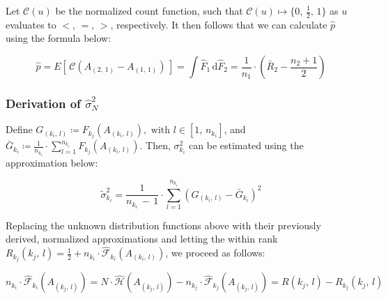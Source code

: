 \documentclass[pdflatex,sn-mathphys-num]{sn-jnl}
\theoremstyle{thmstyleone}
\theoremstyle{thmstyletwo}
\theoremstyle{thmstylethree}
\begin{document}
            \par Let $\mathcal{C}(u)$ be the normalized count function, such that $\mathcal{C}(u) \mapsto \lbrace 0, \, \frac{1}{2}, \, 1\rbrace$ as $u$ evaluates to $<, \, =, \, >$, respectively. It then follows that we can calculate $\hat{p}$ using the formula below:
    
                \vspace{10pt}
    
                \begin{equation}
                    \hat{p} = E[ \, \mathcal{C}(A_{(2, \, 1)} - A_{(1, \, 1)}) \, ] = \int \hat{F}_{1} \, \text{d} \hat{F}_{2} = \frac{1}{n_{1}} \cdot \left( \bar{R}_{2} - \frac{n_{2} + 1}{2} \right)
                \end{equation}

                \vspace{10pt}
                
            \subsubsection{Derivation of \texorpdfstring{$\hat{\sigma}_{N}^{2}$}{̂σₙ²}}

            Define $G_{(k_{i}, \, l)} \coloneqq F_{k_{j}} \left( A_{(k_{i}, \, l)} \right), \text{ with } l \in [1, \, n_{k_{i}}]$, and $\bar{G}_{k_{i}} \coloneqq \frac{1}{n_{k_{i}}} \cdot \sum_{l=1}^{n_{k_{i}}} F_{k_{j}} \left( A_{(k_{i}, \, l)} \right)$. Then, $\sigma_{k_{i}}^{2}$ can be estimated using the approximation below:
            
            \begin{equation}
                \tilde{\sigma}_{k_{i}}^{2} = \frac{1}{n_{k_{i}} \, -  \,1} \cdot \sum_{l=1}^{n_{k_{i}}} \left( G_{(k_{i}, \, l)} - \bar{G}_{k_{i}} \right)^{2} 
            \end{equation}

            \vspace{10pt}

            \noindent Replacing the unknown distribution functions above with their previously derived, normalized approximations and letting the within rank $R_{k_{j}}(k_{j}, \, l) = \frac{1}{2} + n_{k_{i}} \cdot \hat{\mathcal{F}}_{k_{i}} \left( A_{(k_{i}, \, l)} \right)$, we proceed as follows:

            \begin{equation}
                n_{k_{i}} \cdot \hat{\mathcal{F}}_{k_{i}} \left( A_{(k_{j}, \, l)} \right) = N \cdot \hat{\mathcal{H}} \left( A_{(k_{j}, \, l)} \right) - n_{k_{j}} \cdot \hat{\mathcal{F}}_{k_{j}} \left( A_{(k_{j}, \, l)} \right) = R(k_{j}, \, l) - R_{k_{j}}(k_{j}, \, l)
            \end{equation}
\end{document}

